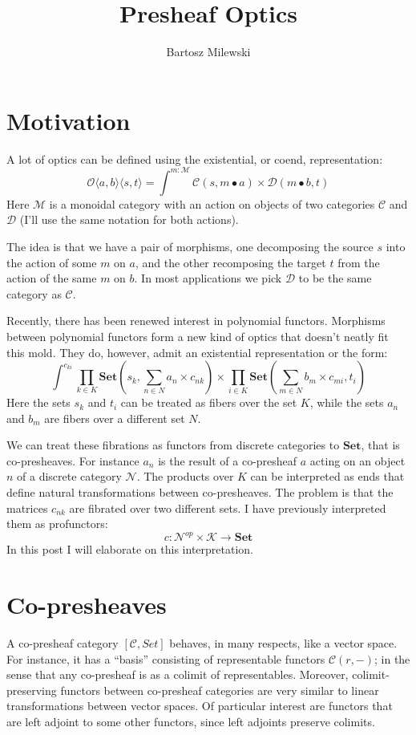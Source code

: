 \documentclass[11pt]{amsart}
\author{Bartosz Milewski}
\title{Presheaf Optics}
\newcommand{\cat}[1]{\mathcal{#1}}%
\newcommand{\Cat}[1]{\mathbf{#1}}%
\newcommand{\Set}{\Cat{Set}}
\begin{document}
\maketitle{}

\section{Motivation}

A lot of optics can be defined using the existential, or coend, representation:
\[ \mathcal{O}\langle a, b\rangle \langle s, t \rangle = \int^{m \colon \cat M} \cat C (s, m \bullet a) \times \cat D ( m \bullet b, t) \]
Here $\cat M$ is a monoidal category with an action on objects of two categories $\cat C$ and $\cat D$ (I'll use the same notation for both actions).

The idea is that we have a pair of morphisms, one decomposing the source $s$ into the action of some $m$ on $a$, and the other recomposing the target $t$ from the action of the same $m$ on $b$. In most applications we pick $\cat D$ to be the same category as $\cat C$.

Recently, there has been renewed interest in polynomial functors. Morphisms between polynomial functors form a new kind of optics that doesn't neatly fit this mold. They do, however, admit an existential representation or the form:
\[ \int^{c_{k i}} 
 \prod_{k \in K} \mathbf{Set} \left(s_k,  \sum_{n \in N} a_n \times c_{n k} \right) \times 
 \prod_{i \in K}  \mathbf{Set} \left(\sum_{m \in N} b_m \times c_{m i}, t_i \right) \]
Here the sets $s_k$ and $t_i$ can be treated as fibers over the set $K$, while the sets $a_n$ and $b_m$ are fibers over a different set $N$. 

We can treat these fibrations as functors from discrete categories to $\Set$, that is co-presheaves. For instance $a_n$ is the result of a co-presheaf $a$ acting on an object $n$ of a discrete category $\cat N$. The products over $K$ can be interpreted as ends that define natural transformations between co-presheaves. The problem is that the matrices $c_{n k}$ are fibrated over two different sets. I have previously interpreted them as profunctors:
\[ c \colon \cat N^{op} \times \cat K \to \Set \]
In this post I will elaborate on this interpretation.

\section{Co-presheaves}

A co-presheaf category  $[\cat C, Set ]$ behaves, in many respects, like a vector space. For instance, it has a ``basis'' consisting of representable functors $\cat C (r, -)$; in the sense that any co-presheaf is as a colimit of representables. Moreover, colimit-preserving functors between co-presheaf categories are very similar to linear transformations between vector spaces. Of particular interest are functors that are left adjoint to some other functors, since left adjoints preserve colimits. 
\end{document}
